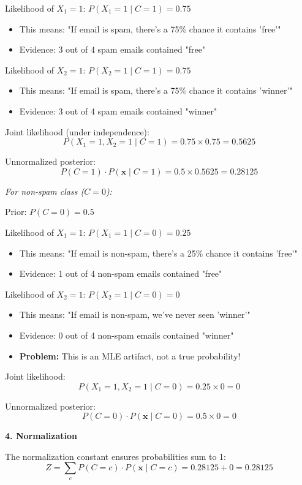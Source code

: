 \documentclass[12pt]{article}
\begin{document}
\begin{explanation}
Likelihood of $X_1 = 1$: $P(X_1 = 1 \mid C = 1) = 0.75$
\begin{itemize}
    \item This means: "If email is spam, there's a 75\% chance it contains 'free'"
    \item Evidence: 3 out of 4 spam emails contained "free"
\end{itemize}

Likelihood of $X_2 = 1$: $P(X_2 = 1 \mid C = 1) = 0.75$
\begin{itemize}
    \item This means: "If email is spam, there's a 75\% chance it contains 'winner'"
    \item Evidence: 3 out of 4 spam emails contained "winner"
\end{itemize}

Joint likelihood (under independence):
\[
P(X_1 = 1, X_2 = 1 \mid C = 1) = 0.75 \times 0.75 = 0.5625
\]

Unnormalized posterior:
\[
P(C = 1) \cdot P(\mathbf{x} \mid C = 1) = 0.5 \times 0.5625 = 0.28125
\]

\textit{For non-spam class ($C = 0$):}

Prior: $P(C = 0) = 0.5$

Likelihood of $X_1 = 1$: $P(X_1 = 1 \mid C = 0) = 0.25$
\begin{itemize}
    \item This means: "If email is non-spam, there's a 25\% chance it contains 'free'"
    \item Evidence: 1 out of 4 non-spam emails contained "free"
\end{itemize}

Likelihood of $X_2 = 1$: $P(X_2 = 1 \mid C = 0) = 0$
\begin{itemize}
    \item This means: "If email is non-spam, we've never seen 'winner'"
    \item Evidence: 0 out of 4 non-spam emails contained "winner"
    \item \textbf{Problem:} This is an MLE artifact, not a true probability!
\end{itemize}

Joint likelihood:
\[
P(X_1 = 1, X_2 = 1 \mid C = 0) = 0.25 \times 0 = 0
\]

Unnormalized posterior:
\[
P(C = 0) \cdot P(\mathbf{x} \mid C = 0) = 0.5 \times 0 = 0
\]

\textbf{4. Normalization}

The normalization constant ensures probabilities sum to 1:
\[
Z = \sum_{c} P(C = c) \cdot P(\mathbf{x} \mid C = c) = 0.28125 + 0 = 0.28125
\]


\end{explanation}
\end{document}
